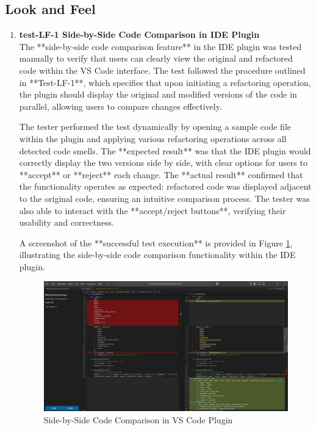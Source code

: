\documentclass[12pt, titlepage]{article}
\begin{document}
\subsection{Look and Feel}
\begin{enumerate}
\item \textbf{test-LF-1 Side-by-Side Code Comparison in IDE Plugin} \\[2mm]
The **side-by-side code comparison feature** in the IDE plugin was tested manually to verify that users can clearly view the original and refactored code within the VS Code interface. The test followed the procedure outlined in **Test-LF-1**, which specifies that upon initiating a refactoring operation, the plugin should display the original and modified versions of the code in parallel, allowing users to compare changes effectively.

The tester performed the test dynamically by opening a sample code file within the plugin and applying various refactoring operations across all detected code smells. The **expected result** was that the IDE plugin would correctly display the two versions side by side, with clear options for users to **accept** or **reject** each change. The **actual result** confirmed that the functionality operates as expected: refactored code was displayed adjacent to the original code, ensuring an intuitive comparison process. The tester was also able to interact with the **accept/reject buttons**, verifying their usability and correctness.

A screenshot of the **successful test execution** is provided in Figure \ref{fig:lf1_test}, illustrating the side-by-side code comparison functionality within the IDE plugin.

\FloatBarrier
\begin{figure}[h]
    \centering
    \includegraphics[width=0.8\linewidth]{../Images/test-LF-1-image.png}
    \caption{Side-by-Side Code Comparison in VS Code Plugin}
    \label{fig:lf1_test}
\end{figure}
\FloatBarrier 


\end{enumerate}
\end{document}
